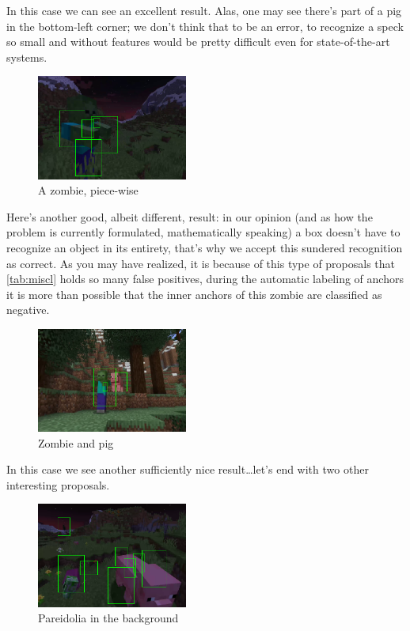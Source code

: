 \documentclass[10pt,journal,cspaper,compsoc]{IEEEtran}
\begin{document}
    In this case we can see an excellent result. Alas, one may see there's part of a pig in the bottom-left corner; we don't think that to be an error, to recognize a speck so small and without features would be pretty difficult even for state-of-the-art systems.

    \begin{figure}[h]
        \centering
        \includegraphics[width=0.44\textwidth]{images/sundered_zombie.png}
        \caption{A zombie, piece-wise}
    \end{figure}

    Here's another good, albeit different, result: in our opinion (and as how the problem is currently formulated, mathematically speaking) a box doesn't have to recognize an object in its entirety,  that's why we accept this sundered recognition as correct. As you may have realized, it is because of this type of proposals that \ref{tab:miscl} holds so many false positives, during the automatic labeling of anchors it is more than possible that the inner anchors of this zombie are classified as negative.

    \begin{figure}[h]
        \centering
        \includegraphics[width=0.44\textwidth]{images/zombie_and_pig.png}
        \caption{Zombie and pig}
    \end{figure}

    In this case we see another sufficiently nice result\dots let's end with two other interesting proposals.

    \begin{figure}[h]
        \centering
        \includegraphics[width=0.44\textwidth]{images/pine.png}
        \caption{Pareidolia in the background}
    \end{figure}
\end{document}
